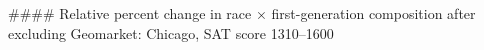 #### Relative percent change in race × first-generation composition after excluding Geomarket: Chicago, SAT score 1310–1600
